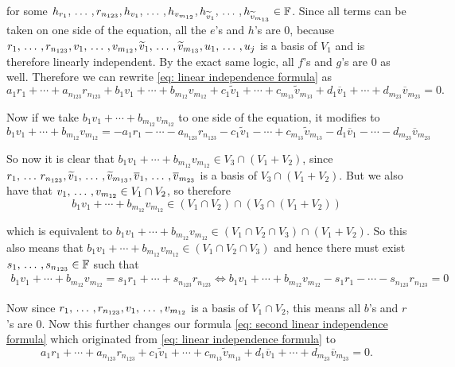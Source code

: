 \begin{xrcs}
for some $h_{r_{1}}, {\, \ldots \,\,}, r_{n_{123}}, h_{v_{1}}, {\, \ldots \,\,}, h_{v_{m_{12}}}, h_{\widetilde{v}_1}, {\, \ldots \,\,},  h_{\widetilde{v}_{m_{13}}}  \in \mathbb{F}$. Since all terms can be taken on one side of the equation, all the $e$'s and $h$'s are $0$, because $r_1, {\, \ldots \,\,}, r_{n_{123}}, v_1, {\, \ldots \,\,}, v_{m_{12}}, \widetilde{v}_1, {\, \ldots \,\,}, \widetilde{v}_{m_{13}}, u_1, {\, \ldots \,\,}, u_j$ is a basis of $V_1$ and is therefore linearly independent. By the exact same logic, all $f$'s and $g$'s are $0$ as well. Therefore we can rewrite \eqref{eq: linear independence formula} as
\begin{equation}
  \label{eq: second linear independence formula}
  a_1r_1 +  \cdots + a_{n_{123}} r_{n_{123}} + b_1v_1 +  \cdots + b_{m_{12}} v_{m_{12}} +  c_1\widetilde{v}_1 + \cdots + c_{m_{13}}\widetilde{v}_{m_{13}} + d_{1}\overline{v}_1 + \cdots + d_{m_{23}}\overline{v}_{m_{23}} = 0.
\end{equation}


Now if we take $b_1v_1 +  \cdots + b_{m_{12}} v_{m_{12}}$ to one side of the equation, it modifies to
\[
b_1v_1 +  \cdots + b_{m_{12}} v_{m_{12}} = -a_1r_1 -  \cdots - a_{n_{123}} r_{n_{123}} -   c_1\widetilde{v}_1 - \cdots + c_{m_{13}}\widetilde{v}_{m_{13}} - d_{1}\overline{v}_1 - \cdots - d_{m_{23}}\overline{v}_{m_{23}}
\]

So now it is clear that $b_1v_1 +  \cdots + b_{m_{12}} v_{m_{12}} \in V_3 \cap (V_1+V_2)$, since $r_1,  {\, \ldots \,\,} r_{n_{123}} ,  \widetilde{v}_1, {\, \ldots \,\,}, \widetilde{v}_{m_{13}}, \overline{v}_1, {\, \ldots \,\,}, \overline{v}_{m_{23}}$ is a basis of $V_3 \cap (V_1+V_2)$. But we also have that $v_1, {\, \ldots \,\,}, v_{m_{12}} \in V_1 \cap V_2$, so therefore
\[
  b_1v_1 +  \cdots + b_{m_{12}} v_{m_{12}} \in (V_1 \cap V_2) \cap (V_3 \cap (V_1+V_2))
\]

which is equivalent to
$
    b_1v_1 +  \cdots + b_{m_{12}} v_{m_{12}} \in (V_1 \cap V_2 \cap V_3) \cap (V_1+V_2).
$
So this also means that $b_1v_1 +  \cdots + b_{m_{12}} v_{m_{12}} \in (V_1 \cap V_2 \cap V_3)$ and hence there must exist $s_1, {\, \ldots \,\,}, s_{n_{123}} \in \mathbb{F}$ such that
\begin{equation}
  \begin{aligned}
    b_1v_1 +  \cdots + b_{m_{12}} v_{m_{12}} = s_1 r_1 + \cdots + s_{n_{123}} r_{n_{123}} \iff
    b_1v_1 +  \cdots + b_{m_{12}} v_{m_{12}} - s_1 r_1 - \cdots - s_{n_{123}} r_{n_{123}} = 0
  \end{aligned}
\end{equation}

Now since $r_1, {\, \ldots \,\,}, r_{n_{123}}, v_1, {\, \ldots \,\,}, v_{m_{12}}$ is a basis of $V_1 \cap V_2$, this means all $b$'s and $r$'s are $0$. Now this further changes our formula \eqref{eq: second linear independence formula} which originated from \eqref{eq: linear independence formula} to
\begin{equation}
  a_1r_1 +  \cdots + a_{n_{123}} r_{n_{123}} + c_1\widetilde{v}_1 + \cdots + c_{m_{13}}\widetilde{v}_{m_{13}} + d_{1}\overline{v}_1 + \cdots + d_{m_{23}}\overline{v}_{m_{23}} = 0.
\end{equation}


\end{xrcs}
